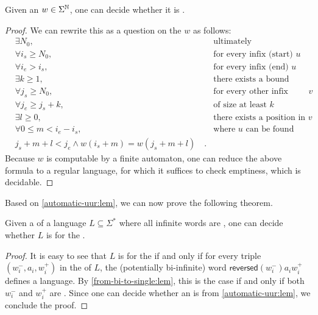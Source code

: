 \begin{lemma}
  \label{automatic-uur:lem}
    Given an  $w \in \Sigma^{\mathbb{N}}$, one can decide
    whether it is .
\end{lemma}
\begin{proof}
    We can rewrite this as a question on the  $w$
    as follows:
    \begin{align*}
        &\exists N_0,                   &   \text{ultimately} \\
        &\forall i_s \geq N_0,          &   \text{for every infix (start) } u \\
        &\forall i_e > i_s,             &   \text{for every infix (end) }   u \\
        &\exists k \geq 1,              &   \text{there exists a bound} \\
        &\forall j_s \geq N_0,          &   \text{for every other infix (start) } v \\
        &\forall j_e \geq j_s + k,      &   \text{of size at least $k$} \\
        &\exists l \geq 0,              &   \text{there exists a position in } v \\
        &\forall 0 \leq m < i_e - i_s,  &   \text{where } u \text{ can be found} \\
        &j_s + m + l < j_e \land
        w(i_s + m) = w(j_s + m + l) \quad .
    \end{align*}
    Because $w$ is computable by a finite automaton, one can reduce the above
    formula to a regular language, for which it suffices to check emptiness, which
    is decidable.
\end{proof}

Based on \cref{automatic-uur:lem}, we can now prove the following theorem.
\begin{theorem}
    \label{automatic-wqo:thm}
    Given a  of a language $L \subseteq
    \Sigma^*$ where all infinite words are , one can
    decide whether $L$ is  for the .
\end{theorem}
\begin{proof}
    It is easy to see that $L$ is  for the  if and only if for every triple $(w_i^-, a_i, w_i^+)$ in the
     of $L$, the (potentially bi-infinite) word
    $\mathsf{reversed}(w_i^-) a_i w_i^+$ defines a 
    language. By \cref{from-bi-to-single:lem}, this is the case if and only if
    both $w_i^-$ and $w_i^+$ are . 
    Since one can decide whether an  is
     from \cref{automatic-uur:lem},
    we conclude the proof.
\end{proof}

